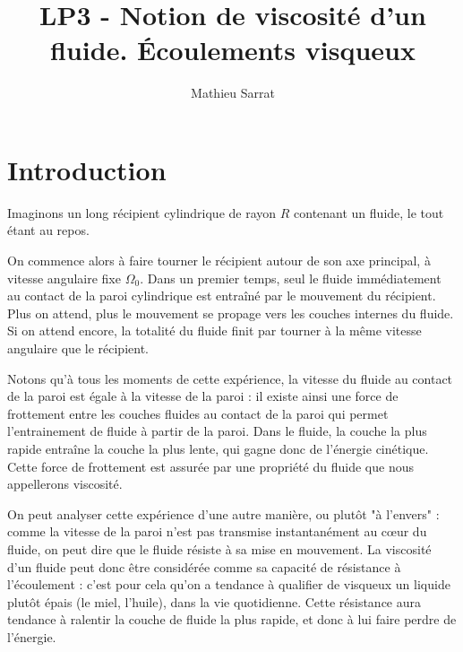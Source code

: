 \documentclass[11pt,a4paper]{report}
\author{Mathieu Sarrat}
\title{LP3 - Notion de viscosité d'un fluide. Écoulements visqueux}
\begin{document}
\maketitle

\section{Introduction}

Imaginons un long récipient cylindrique de rayon $R$ contenant un fluide, le tout étant au repos. 

On commence alors à faire tourner le récipient autour de son axe principal, à vitesse angulaire fixe $\Omega_0$. Dans un premier temps, seul le fluide immédiatement au contact de la paroi cylindrique est entraîné par le mouvement du récipient. Plus on attend, plus le mouvement se propage vers les couches internes du fluide. Si on attend encore, la totalité du fluide finit par tourner à la même vitesse angulaire que le récipient. 


Notons qu'à tous les moments de cette expérience, la vitesse du fluide au contact de la paroi est égale à la vitesse de la paroi : il existe ainsi une force de frottement entre les couches fluides au contact de la paroi qui permet l'entrainement de fluide à partir de la paroi. Dans le fluide, la couche la plus rapide entraîne la couche la plus lente, qui gagne donc de l'énergie cinétique. Cette force de frottement est assurée par une propriété du fluide que nous appellerons viscosité.

On peut analyser cette expérience d'une autre manière, ou plutôt "à l'envers" : comme la vitesse de la paroi n'est pas transmise instantanément au cœur du fluide, on peut dire que le fluide résiste à sa mise en mouvement. La viscosité d'un fluide peut donc être considérée comme sa capacité de résistance à l'écoulement : c'est pour cela qu'on a tendance à qualifier de visqueux un liquide plutôt épais (le miel, l'huile), dans la vie quotidienne. Cette résistance aura tendance à ralentir la couche de fluide la plus rapide, et donc à lui faire perdre de l'énergie. 
\end{document}
